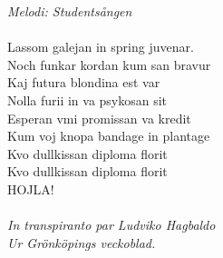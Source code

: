 {\footnotesize\textit{Melodi: Studentsången}}\\
\\
Lassom galejan in spring juvenar.\\
Noch funkar kordan kum san bravur\\
Kaj futura blondina est var\\
Nolla furii in va psykosan sit\\
Esperan vmi promissan va kredit\\
Kum voj knopa bandage in plantage\\
Kvo dullkissan diploma florit\\
Kvo dullkissan diploma florit\\
HOJLA!\\
\\
{\footnotesize\textit{In transpiranto par Ludviko Hagbaldo\\ Ur
    Grönköpings veckoblad.}}
